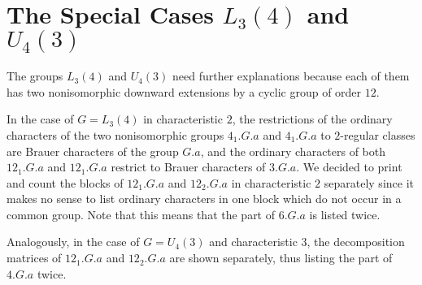 \documentclass[a4paper]{article}
\begin{document}
\section{The Special Cases $L_3(4)$ and $U_4(3)$}

The groups $L_3(4)$ and $U_4(3)$ need further explanations because each
of them has two nonisomorphic downward extensions by a cyclic group of
order $12$.

In the case of $G = L_3(4)$ in characteristic $2$,
the restrictions of the ordinary characters of the two nonisomorphic
groups $4_1.G.a$ and $4_1.G.a$ to $2$-regular classes are Brauer
characters of the group $G.a$,
and the ordinary characters of both
$12_1.G.a$ and $12_1.G.a$ restrict to Brauer characters of $3.G.a$.
We decided to print and count the blocks of $12_1.G.a$ and $12_2.G.a$
in characteristic $2$ separately since it makes no sense to list ordinary
characters in one block which do not occur in a common group.
Note that this means that the part of $6.G.a$ is listed twice.

Analogously, in the case of $G = U_4(3)$ and characteristic $3$,
the decomposition matrices of $12_1.G.a$ and $12_2.G.a$ are shown
separately,
thus listing the part of $4.G.a$ twice.


\end{document}

